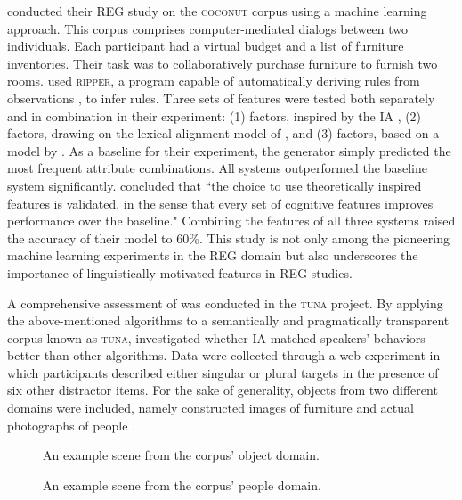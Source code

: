 \citet{jordan2005learning2} conducted their REG study on the \textsc{coconut} corpus using a machine learning approach. This corpus comprises computer-mediated dialogs between two individuals. Each participant had a virtual budget and a list of furniture inventories. Their task was to collaboratively purchase furniture to furnish two rooms. \citet{jordan2005learning2} used \textsc{ripper}, a program capable of automatically deriving rules from observations \citep{cohen1996learning}, to infer rules. Three sets of features were tested both separately and in combination in their experiment: (1)  factors, inspired by the IA \citep{dale1995computational}, (2)  factors, drawing on the lexical alignment model of \citet{brennan1996lexical}, and (3)  factors, based on a model by \citet{jordan2000learning}. As a baseline for their experiment, the generator simply predicted the most frequent attribute combinations. All systems outperformed the baseline system significantly. \citet{jordan2005learning2} concluded that ``the choice to use theoretically inspired features is validated, in the sense that every set of cognitive features improves performance over the baseline." Combining the features of all three systems raised the accuracy of their model to 60\%. This study is not only among the pioneering machine learning experiments in the REG domain but also underscores the importance of linguistically motivated features in REG studies.

\begin{sloppypar}
A comprehensive assessment of \shot was conducted in the \textsc{tuna} project. By applying the above-mentioned algorithms to a semantically and pragmatically transparent corpus known as \textsc{tuna}, \citet{gatt2007evaluating} investigated whether IA matched speakers' behaviors better than other algorithms. Data were collected through a web experiment in which participants described either singular or plural targets in the presence of six other distractor items. For the sake of generality, objects from two different domains were included, namely constructed images of furniture and actual photographs of people \citep{van2006building}.
\end{sloppypar}

\begin{figure}
	\begin{floatrow}
	\captionsetup{margin=.05\linewidth}
		{\caption{An example scene from the  corpus' object domain.}
		\label{fig:tuna-object}}
		{\caption{An example scene from the  corpus' people domain.}
		\label{fig:tuna-people}}
	\end{floatrow}
\end{figure}

